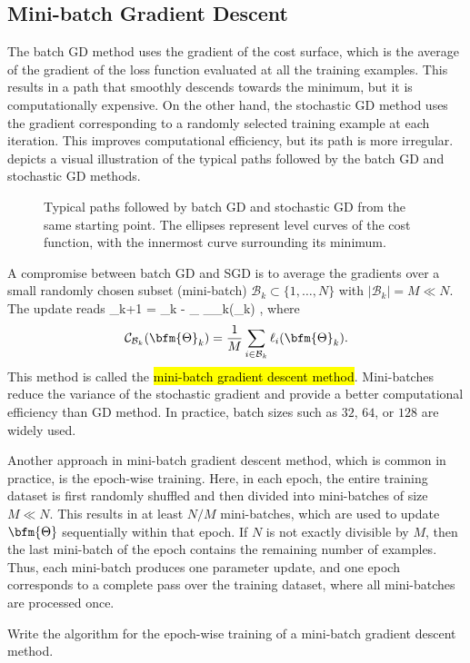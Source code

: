 \subsection{Mini-batch Gradient Descent}\label{mini.batch.gd.subs}
The batch GD method uses the gradient of the cost surface, which is the average of the gradient of the loss function evaluated at all the training examples.  This results in a path that smoothly descends towards the minimum, but it is computationally expensive. On the other hand, the stochastic GD method uses the gradient corresponding to a randomly selected training example at each iteration. This improves computational efficiency, but its path is more irregular.  depicts a visual illustration of the typical paths followed by the batch GD and stochastic GD methods.

\begin{figure}
\centering

\caption{Typical paths followed by batch GD and stochastic GD from the same starting point. The ellipses represent level curves of the cost function, with the innermost curve surrounding its minimum.}
\label{BatchVsStocGD.fig}
\end{figure}


A compromise between batch GD and SGD is to average the gradients over a small randomly chosen subset (mini-batch) $\mathcal{B}_k\subset \{1,\dots,N\}$ with $|\mathcal{B}_k|=M\ll N$. The update reads
\bea\label{miniGD}
\bfm{\Theta}_{k+1}
= \bfm{\Theta}_k -  \eta \nabla_{\bfm{\Theta}} _{_k}(\bfm{\Theta}_k) ,
\eea
where
$$
\mathcal{C}_{\mathcal{B}_k}(\bfm{\Theta}_k) = \frac{1}{M}\sum_{i\in \mathcal{B}_k}
\ell_i(\bfm{\Theta}_k).
$$
This method is called the \hl{mini-batch gradient descent method}.
Mini-batches reduce the variance of the stochastic gradient and provide a better computational efficiency than GD method. In practice, batch sizes such as $32$, $64$, or $128$ are widely used.

Another approach in mini-batch gradient descent method, which is common in practice, is the epoch-wise training. Here, in each epoch, the entire training dataset is first randomly shuffled and then divided into mini-batches of size $M\ll N$.  This results in at least $N/M$ mini-batches, which are used to update $\bfm{\Theta}$ sequentially within that epoch.  If $N$ is not exactly divisible by $M$, then the last mini-batch of the epoch contains the remaining number of examples.  Thus, each mini-batch produces one parameter update, and one epoch corresponds to a complete pass over the training dataset, where all mini-batches are processed once. 
\begin{problem}
Write the algorithm for the epoch-wise training of a mini-batch gradient descent method.
\end{problem}

